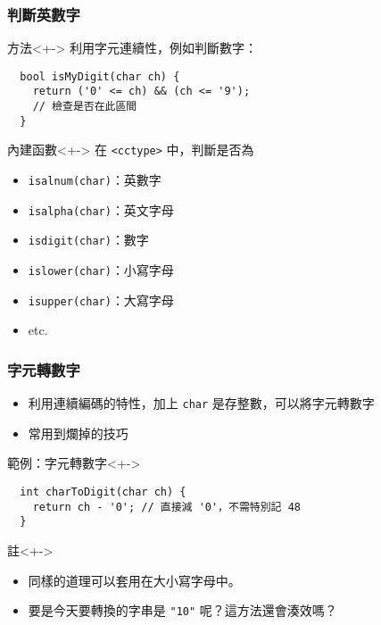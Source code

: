 \documentclass[utf8]{beamer}
\begin{document}
\begin{CJK}{UTF8}{bkai}
\begin{frame}[fragile]
  \frametitle{判斷英數字}
  \begin{exampleblock}{方法}<+->
  利用字元連續性，例如判斷數字：
  \onslide<+->
    \begin{lstlisting}
  bool isMyDigit(char ch) {
    return ('0' <= ch) && (ch <= '9');
    // 檢查是否在此區間
  }
    \end{lstlisting}
  \end{exampleblock}
  \begin{block}{內建函數}<+->
  在 \lstinline{<cctype>}{} 中，判斷是否為
  \begin{multicols}{2}
    \begin{itemize}[<+->]
    \item \lstinline{isalnum(char)}{}：英數字
    \item \lstinline{isalpha(char)}{}：英文字母
    \item \lstinline{isdigit(char)}{}：數字
    \item \lstinline{islower(char)}{}：小寫字母
    \item \lstinline{isupper(char)}{}：大寫字母
    \item etc.
    \end{itemize}
  \end{multicols}
  \end{block}
\end{frame}

\begin{frame}[fragile]
  \frametitle{字元轉數字}
  \begin{itemize}[<+->]
  \item 利用\alert{連續編碼}的特性，加上 \lstinline{char}{} 是\alert{存整數}，可以將字元轉數字
  \item 常用到爛掉的技巧
  \end{itemize}
  \begin{exampleblock}{範例：字元轉數字}<+->
    \begin{lstlisting}
  int charToDigit(char ch) {
    return ch - '0'; // 直接減 '0'，不需特別記 48
  }
    \end{lstlisting}
  \end{exampleblock}
  \begin{alertblock}{註}<+->
    \begin{itemize}
    \item 同樣的道理可以套用在大小寫字母中。
    \item<+-> 要是今天要轉換的\alert{字串}是 \lstinline{"10"}{} 呢？這方法還會湊效嗎？
    \end{itemize}
  \end{alertblock}
\end{frame}


\end{CJK}
\end{document}
